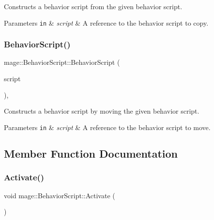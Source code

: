 Constructs a behavior script from the given behavior script.


\begin{DoxyParams}[1]{Parameters}
\mbox{\tt in}  & {\em script} & A reference to the behavior script to copy. \\
\hline
\end{DoxyParams}
\hypertarget{classmage_1_1_behavior_script_aa8f509053f6bb9dbfd3baa75bdd8b91e}{}\label{classmage_1_1_behavior_script_aa8f509053f6bb9dbfd3baa75bdd8b91e} 
\subsubsection{\texorpdfstring{Behavior\+Script()}{BehaviorScript()}\hspace{0.1cm}{\footnotesize\ttfamily [3/3]}}
{\footnotesize\ttfamily mage\+::\+Behavior\+Script\+::\+Behavior\+Script (\begin{DoxyParamCaption}\item[{\hyperlink{classmage_1_1_behavior_script}{Behavior\+Script} \&\&}]{script }\end{DoxyParamCaption})\hspace{0.3cm}{\ttfamily [protected]}, {\ttfamily [default]}}

Constructs a behavior script by moving the given behavior script.


\begin{DoxyParams}[1]{Parameters}
\mbox{\tt in}  & {\em script} & A reference to the behavior script to move. \\
\hline
\end{DoxyParams}


\subsection{Member Function Documentation}
\hypertarget{classmage_1_1_behavior_script_a84a5bf0fc7ec3ecd36dddaf001143b54}{}\label{classmage_1_1_behavior_script_a84a5bf0fc7ec3ecd36dddaf001143b54} 
\subsubsection{\texorpdfstring{Activate()}{Activate()}}
{\footnotesize\ttfamily void mage\+::\+Behavior\+Script\+::\+Activate (\begin{DoxyParamCaption}{ }\end{DoxyParamCaption})\hspace{0.3cm}{\ttfamily [noexcept]}}

